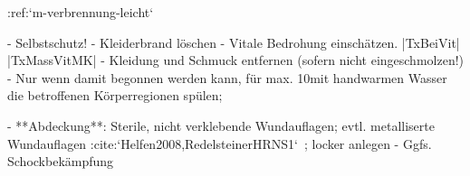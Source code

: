 :ref:`m-verbrennung-leicht`
\begin{itemize}
  -   Selbstschutz!
  -   Kleiderbrand löschen
  -   Vitale Bedrohung einschätzen. |TxBeiVit| |TxMassVitMK|
  -   Kleidung und Schmuck entfernen (sofern nicht  eingeschmolzen!)
  -   Nur wenn 
  damit begonnen werden kann, für max. 10\Min* mit handwarmen
  Wasser die betroffenen Körperregionen spülen;
  
  -   **Abdeckung**: Sterile, nicht verklebende
  Wundauflagen; evtl. metalliserte Wundauflagen
 :cite:`Helfen2008,RedelsteinerHRNS1`\ ; locker anlegen
  -   Ggfs. Schockbekämpfung
\end{itemize}